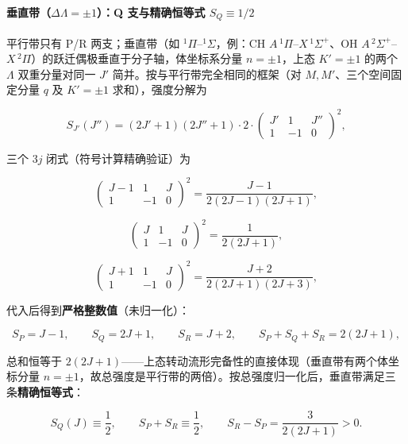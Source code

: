 \documentclass[
]{ctexbook}
\begin{document}
\hypertarget{ux5782ux76f4ux5e26deltalambdapm1q-ux652fux4e0eux7cbeux786eux6052ux7b49ux5f0f-s_qequiv12}{%
\paragraph{\texorpdfstring{垂直带（\(\Delta\Lambda=\pm1\)）：Q
支与精确恒等式
\(S_Q\equiv1/2\)}{垂直带（\textbackslash Delta\textbackslash Lambda=\textbackslash pm1）：Q 支与精确恒等式 S\_Q\textbackslash equiv1/2}}\label{ux5782ux76f4ux5e26deltalambdapm1q-ux652fux4e0eux7cbeux786eux6052ux7b49ux5f0f-s_qequiv12}}

平行带只有 P/R 两支；垂直带（如 \(^{1}\Pi\)--\(^{1}\Sigma\)，例：CH
\(A\,^{1}\Pi\)--\(X\,^{1}\Sigma^{+}\)、OH
\(A\,^{2}\Sigma^{+}\)--\(X\,^{2}\Pi\)）的跃迁偶极垂直于分子轴，体坐标系分量
\(n=\pm1\)，上态 \(K'=\pm1\) 的两个 \(\Lambda\) 双重分量对同一 \(J'\)
简并。按与平行带完全相同的框架（对 \(M,M'\)、三个空间固定分量 \(q\) 及
\(K'=\pm1\) 求和），强度分解为

\[
S_{J'}(J'')
=(2J'+1)(2J''+1)\cdot 2\cdot
\begin{pmatrix}J'&1&J''\\1&-1&0\end{pmatrix}^{2},
\]

三个 \(3j\) 闭式（符号计算精确验证）为

\[
\begin{pmatrix}J-1&1&J\\1&-1&0\end{pmatrix}^{2}
=\frac{J-1}{2(2J-1)(2J+1)},
\]

\[
\begin{pmatrix}J&1&J\\1&-1&0\end{pmatrix}^{2}
=\frac{1}{2(2J+1)},
\]

\[
\begin{pmatrix}J+1&1&J\\1&-1&0\end{pmatrix}^{2}
=\frac{J+2}{2(2J+1)(2J+3)},
\]

代入后得到\textbf{严格整数值}（未归一化）：

\[
S_P=J-1,\qquad S_Q=2J+1,\qquad S_R=J+2,\qquad
S_P+S_Q+S_R=2(2J+1),
\]

总和恒等于
\(2(2J+1)\)------上态转动流形完备性的直接体现（垂直带有两个体坐标分量
\(n=\pm1\)，故总强度是平行带的两倍）。按总强度归一化后，垂直带满足三条\textbf{精确恒等式}：

\[
S_Q(J)\equiv\frac{1}{2},\qquad S_P+S_R\equiv\frac{1}{2},\qquad
S_R-S_P=\frac{3}{2(2J+1)}>0.
\]
\end{document}
